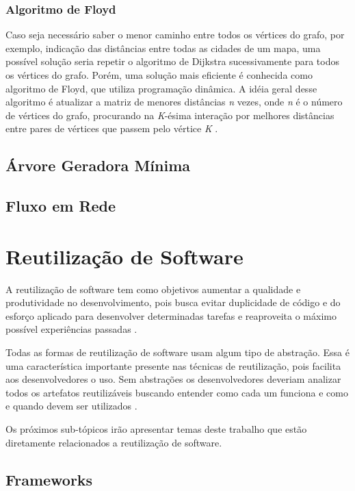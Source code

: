 \subsubsection{Algoritmo de Floyd}

Caso seja necessário saber o menor caminho entre todos os vértices do grafo, por exemplo, indicação das distâncias entre todas as cidades de um mapa, uma possível solução seria repetir o algoritmo de Dijkstra sucessivamente para todos os vértices do grafo. Porém, uma solução mais eficiente é conhecida como algoritmo de Floyd, que utiliza programação dinâmica. A idéia geral desse algoritmo é atualizar a matriz de menores distâncias \textit{n} vezes, onde \textit{n} é o número de vértices do grafo, procurando na \textit{K}-ésima interação por melhores distâncias entre pares de vértices que passem pelo vértice \textit{K} \cite{Sampaio:2005}.

\subsection{Árvore Geradora Mínima}

\subsection{Fluxo em Rede}

\section{Reutilização de Software}

A reutilização de software tem como objetivos aumentar a qualidade e produtividade no desenvolvimento, pois busca evitar duplicidade de código e do esforço aplicado para desenvolver determinadas tarefas e reaproveita o máximo possível experiências passadas \cite{Lucredio:2009}.

Todas as formas de reutilização de software usam algum tipo de abstração.  Essa é uma característica importante presente nas técnicas de reutilização, pois facilita aos desenvolvedores o uso. Sem abstrações os desenvolvedores deveriam analizar todos os artefatos reutilizáveis buscando entender como cada um funciona e como e quando devem ser utilizados \cite{Krueger:1992}.

Os próximos sub-tópicos irão apresentar temas deste trabalho que estão diretamente relacionados a reutilização de software.

\subsection{Frameworks}

